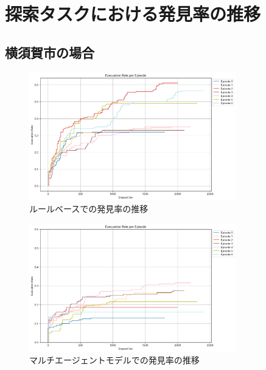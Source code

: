 \section{探索タスクにおける発見率の推移}

\subsection{横須賀市の場合}
\begin{figure}[H] 
  \centering 
  \includegraphics[width=0.8\textwidth]{Figures/YokosukaSearch-RuleResult.png}
  \caption{ルールベースでの発見率の推移} 
\end{figure}

\begin{figure}[H] 
  \centering 
  \includegraphics[width=0.8\textwidth]{Figures/YokosukaSearch-AgentsResult.png}
  \caption{マルチエージェントモデルでの発見率の推移} 
\end{figure}

